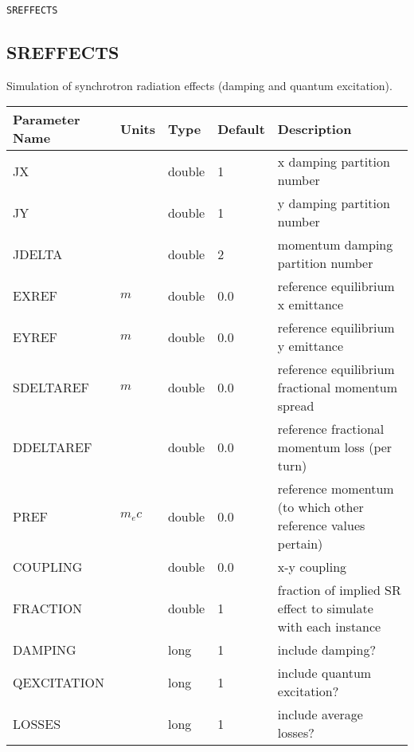 \begin{latexonly}
\newpage
\begin{center}{\Large\verb|SREFFECTS|}\end{center}
\end{latexonly}\subsection{SREFFECTS}
Simulation of synchrotron radiation effects (damping and quantum excitation).
\\
\begin{tabular}{|l|l|l|l|p{\descwidth}|} \hline
Parameter Name & Units & Type & Default & Description \\ \hline 
JX &  & double &   1 & x damping partition number  \\ \hline 
JY &  & double &   1 & y damping partition number  \\ \hline 
JDELTA &  & double &   2 & momentum damping partition number  \\ \hline 
EXREF & $m$ & double &  0.0 & reference equilibrium x emittance  \\ \hline 
EYREF & $m$ & double &  0.0 & reference equilibrium y emittance  \\ \hline 
SDELTAREF & $m$ & double &  0.0 & reference equilibrium fractional momentum spread  \\ \hline 
DDELTAREF &  & double &  0.0 & reference fractional momentum loss (per turn)  \\ \hline 
PREF & $m_{e}c$ & double &  0.0 & reference momentum (to which other reference values pertain)  \\ \hline 
COUPLING &  & double &  0.0 & x-y coupling  \\ \hline 
FRACTION &  & double &   1 & fraction of implied SR effect to simulate with each instance  \\ \hline 
DAMPING &  & long &   1               & include damping?  \\ \hline 
QEXCITATION &  & long &   1               & include quantum excitation?  \\ \hline 
LOSSES &  & long &   1               & include average losses?  \\ \hline 
\end{tabular}

